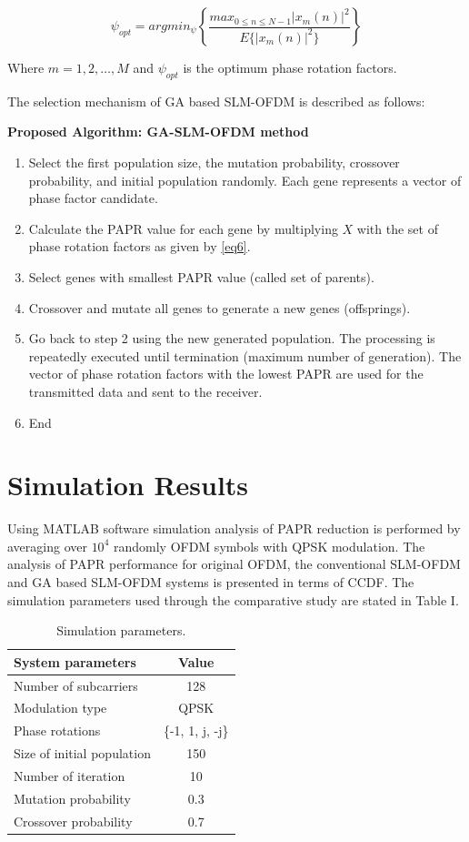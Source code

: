 \documentclass[conference]{IEEEtran}
\begin{document}
\begin{equation}
\psi_{opt} = argmin_{\psi} \left\{ \frac{max_{0\leq n\leq N-1} |x_m(n)|^2}{E\{|x_m(n)|^2\}} \right\}
\label{eq7}
\end{equation}

Where $m = 1,2, \dots , M$ and $\psi_{opt}$ is the optimum phase rotation factors.

The selection mechanism of GA based SLM-OFDM is described as follows:

\textbf{Proposed Algorithm: GA-SLM-OFDM method}
\begin{enumerate}
    \item Select the first population size, the mutation probability, crossover probability, and initial population randomly. Each gene represents a vector of phase factor candidate.
    \item Calculate the PAPR value for each gene by multiplying $X$ with the set of phase rotation factors as given by \eqref{eq6}.
    \item Select genes with smallest PAPR value (called set of parents).
    \item Crossover and mutate all genes to generate a new genes (offsprings).
    \item Go back to step 2 using the new generated population. The processing is repeatedly executed until termination (maximum number of generation). The vector of phase rotation factors with the lowest PAPR are used for the transmitted data and sent to the receiver.
    \item End
\end{enumerate}

\section{Simulation Results}
Using MATLAB software simulation analysis of PAPR reduction is performed by averaging over $10^4$ randomly OFDM symbols with QPSK modulation. The analysis of PAPR performance for original OFDM, the conventional SLM-OFDM and GA based SLM-OFDM systems is presented in terms of CCDF. The simulation parameters used through the comparative study are stated in Table I.

\begin{table}[htbp]
\caption{Simulation parameters.}
\begin{center}
\begin{tabular}{|l|c|}
\hline
\textbf{System parameters} & \textbf{Value} \\
\hline
Number of subcarriers & 128 \\
Modulation type & QPSK \\
Phase rotations & \{-1, 1, j, -j\} \\
Size of initial population & 150 \\
Number of iteration & 10 \\
Mutation probability & 0.3 \\
Crossover probability & 0.7 \\
\hline
\end{tabular}
\label{tab1}
\end{center}
\end{table}
\end{document}
